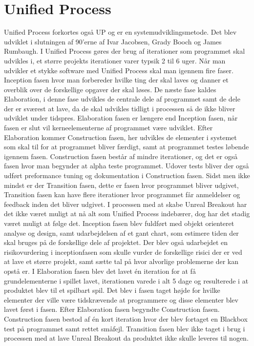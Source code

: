 \section{Unified Process}
Unified Process forkortes også UP og er en systemudviklingsmetode. Det blev udviklet i slutningen af 90'erne af Ivar Jacobsen, Grady Booch og James Rumbaugh. I Unified Process gøres der brug af iterationer som programmet skal udvikles i, et større projekts iterationer varer typsik 2 til 6 uger. Når man udvikler et stykke software med Unified Process skal man igennem fire faser. Inception fasen hvor man forbereder hvilke ting der skal laves og danner et overblik over de forskellige opgaver der skal løses. De næste fase kaldes Elaboration, i denne fase udvikles de centrale dele af programmet samt de dele der er sværest at lave, da de skal udvikles tidligt i processen så de ikke bliver udviklet under tidspres. Elaboration fasen er længere end Inception fasen, når fasen er slut vil kerneelementerne af programmet være udviklet. Efter Elaboration kommer Construction fasen, her udvikles de elementer i systemet som skal til for at programmet bliver færdigt, samt at programmet testes løbende igennem fasen. Construction fasen består af mindre iterationer, og det er også fasen hvor man begynder at alpha teste programmet. Udover tests bliver der også udført preformance tuning og dokumentation i Construction fasen. Sidst men ikke mindst er der Transition fasen, dette er fasen hvor programmet bliver udgivet, Transition fasen kan have flere iterationer hvor programmet får anmeldelser og feedback inden det bliver udgivet. \newline
\newline
I processen med at skabe Unreal Breakout har det ikke været muligt at nå alt som Unified Process indebærer, dog har det stadig været muligt at følge det. Inception fasen blev fuldført med objekt orienteret analyse og design, samt udarbejdelsen af et gant chart, som estimere tiden der skal bruges på de forskellige dele af projektet. Der blev også udarbejdet en risikovurdering i inceptionfasen som skulle vurder de forskellige risici der er ved at lave et større projekt, samt sætte tal på hvor alvorlige problemerne der kan opstå er. \newline
I Elaboration fasen blev det lavet én iteration for at få grundelementerne i spillet lavet, iterationen varede i alt 5 dage og resulterede i at produktet blev til et spilbart spil. Det blev i fasen taget højde for hvilke elementer der ville være tidskrævende at programmere og disse elementer blev lavet først i fasen. \newline
Efter Elaboration fasen begyndte Construction fasen. Construction fasen bestod af én kort iteration hvor der blev fortaget en Blackbox test på programmet samt rettet småfejl. 
\newline
Transition fasen blev ikke taget i brug i processen med at lave Unreal Breakout da produktet ikke skulle leveres til nogen. 
 

 